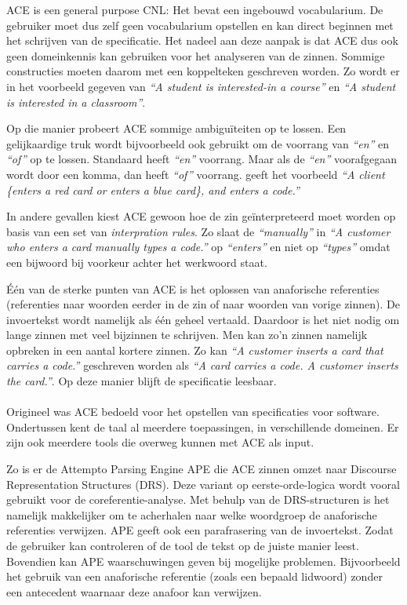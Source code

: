 \documentclass[]{article}
\theoremstyle{definition}
\newcommand{\example}[1]{\textit{``#1''}}
\begin{document}
ACE is een general purpose CNL: Het bevat een ingebouwd vocabularium. De gebruiker moet dus zelf geen vocabularium opstellen en kan direct beginnen met het schrijven van de specificatie. Het nadeel aan deze aanpak is dat ACE dus ook geen domeinkennis kan gebruiken voor het analyseren van de zinnen. Sommige constructies moeten daarom met een koppelteken geschreven worden. Zo wordt er in \cite{ACEConstructionRules} het voorbeeld gegeven van \example{A student is interested-in a course} en \example{A student is interested in a classroom}.

Op die manier probeert ACE sommige ambiguïteiten op te lossen. Een gelijkaardige truk wordt bijvoorbeeld ook gebruikt om de voorrang van \example{en} en \example{of} op te lossen. Standaard heeft \example{en} voorrang. Maar als de \example{en} voorafgegaan wordt door een komma, dan heeft \example{of} voorrang. \cite{ACEConstructionRules} geeft het voorbeeld \example{A client \{enters a red card or enters a blue card\}, and enters a code.}

In andere gevallen kiest ACE gewoon hoe de zin geïnterpreteerd moet worden op basis van een set van \textit{interpration rules}. Zo slaat de \example{manually} in \example{A customer who {enters a card manually} types a code.}\cite{ACEConstructionRules} op \example{enters} en niet op \example{types} omdat een bijwoord bij voorkeur achter het werkwoord staat.

Één van de sterke punten van ACE is het oplossen van anaforische referenties (referenties naar woorden eerder in de zin of naar woorden van vorige zinnen). De invoertekst wordt namelijk als één geheel vertaald. Daardoor is het niet nodig om lange zinnen met veel bijzinnen te schrijven. Men kan zo'n zinnen namelijk opbreken in een aantal kortere zinnen. Zo kan \example{A customer inserts a card that carries a code.} geschreven worden als \example{A card carries a code. A customer inserts the card.}\cite{Fuchs2008}. Op deze manier blijft de specificatie leesbaar.

\paragraph{} Origineel was ACE bedoeld voor het opstellen van specificaties voor software. Ondertussen kent de taal al meerdere toepassingen, in verschillende domeinen. Er zijn ook meerdere tools die overweg kunnen met ACE als input.

Zo is er de Attempto Parsing Engine APE die ACE zinnen omzet naar Discourse Representation Structures (DRS). Deze variant op eerste-orde-logica wordt vooral gebruikt voor de coreferentie-analyse. Met behulp van de DRS-structuren is het namelijk makkelijker om te acherhalen naar welke woordgroep de anaforische referenties verwijzen. APE geeft ook een parafrasering van de invoertekst. Zodat de gebruiker kan controleren of de tool de tekst op de juiste manier leest. Bovendien kan APE waarschuwingen geven bij mogelijke problemen. Bijvoorbeeld het gebruik van een anaforische referentie (zoals een bepaald lidwoord) zonder een antecedent waarnaar deze anafoor kan verwijzen.
\end{document}
